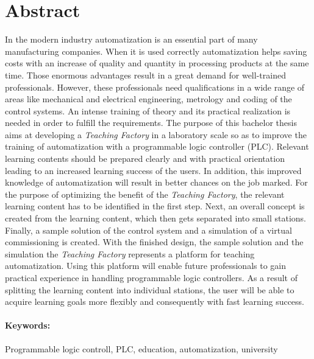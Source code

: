 \section*{Abstract}
 In the modern industry automatization is an essential part of many manufacturing companies. When it is used correctly automatization helps saving costs with an increase of quality and quantity in processing products at the same time. Those enormous advantages result in a great demand for well-trained professionals. However, these professionals need qualifications in a wide range of areas like mechanical and electrical engineering, metrology and coding of the control systems. An intense training of theory and its practical realization is needed in order to fulfill the requirements.
The purpose of this bachelor thesis aims at developing a \textit{Teaching Factory} in a laboratory scale so as to improve the training of automatization with a programmable logic controller (\acs{PLC}). Relevant learning contents should be prepared clearly and with practical orientation leading to an increased learning success of the users. In addition, this improved knowledge of automatization will result in better chances on the job marked. 
For the purpose of optimizing the benefit of the \textit{Teaching Factory}, the relevant learning content has to be identified in the first step. Next, an overall concept is created from the learning content, which then gets separated into small stations. Finally, a sample solution of the control system and a simulation of a virtual commissioning is created. 
With the finished design, the sample solution and the simulation the \textit{Teaching Factory} represents a platform for teaching automatization. Using this platform will enable future professionals to gain practical experience in handling programmable logic controllers. As a result of splitting the learning content into individual stations, the user will be able to acquire learning goals more flexibly and consequently with fast learning success.


\paragraph*{Keywords:} Programmable logic controll, PLC, education, automatization, university